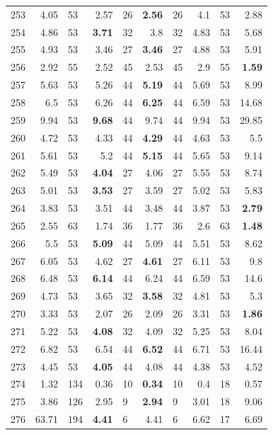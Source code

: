\begin{longtable}{lr@{\hskip 4pt}l@{\hskip 12pt}r@{\hskip 4pt}l@{\hskip 12pt}r@{\hskip 4pt}l@{\hskip 12pt}r@{\hskip 4pt}l@{\hskip 12pt}r}
253 & 4.05 & 53 & 2.57 & 26 & \textbf{2.56} & 26 & 4.1 & 53 & 2.88 \\
254 & 4.86 & 53 & \textbf{3.71} & 32 & 3.8 & 32 & 4.83 & 53 & 5.68 \\
255 & 4.93 & 53 & 3.46 & 27 & \textbf{3.46} & 27 & 4.88 & 53 & 5.91 \\
256 & 2.92 & 55 & 2.52 & 45 & 2.53 & 45 & 2.9 & 55 & \textbf{1.59} \\
257 & 5.63 & 53 & 5.26 & 44 & \textbf{5.19} & 44 & 5.69 & 53 & 8.99 \\
258 & 6.5 & 53 & 6.26 & 44 & \textbf{6.25} & 44 & 6.59 & 53 & 14.68 \\
259 & 9.94 & 53 & \textbf{9.68} & 44 & 9.74 & 44 & 9.94 & 53 & 29.85 \\
260 & 4.72 & 53 & 4.33 & 44 & \textbf{4.29} & 44 & 4.63 & 53 & 5.5 \\
261 & 5.61 & 53 & 5.2 & 44 & \textbf{5.15} & 44 & 5.65 & 53 & 9.14 \\
262 & 5.49 & 53 & \textbf{4.04} & 27 & 4.06 & 27 & 5.55 & 53 & 8.74 \\
263 & 5.01 & 53 & \textbf{3.53} & 27 & 3.59 & 27 & 5.02 & 53 & 5.83 \\
264 & 3.83 & 53 & 3.51 & 44 & 3.48 & 44 & 3.87 & 53 & \textbf{2.79} \\
265 & 2.55 & 63 & 1.74 & 36 & 1.77 & 36 & 2.6 & 63 & \textbf{1.48} \\
266 & 5.5 & 53 & \textbf{5.09} & 44 & 5.09 & 44 & 5.51 & 53 & 8.62 \\
267 & 6.05 & 53 & 4.62 & 27 & \textbf{4.61} & 27 & 6.11 & 53 & 9.8 \\
268 & 6.48 & 53 & \textbf{6.14} & 44 & 6.24 & 44 & 6.59 & 53 & 14.6 \\
269 & 4.73 & 53 & 3.65 & 32 & \textbf{3.58} & 32 & 4.81 & 53 & 5.3 \\
270 & 3.33 & 53 & 2.07 & 26 & 2.09 & 26 & 3.31 & 53 & \textbf{1.86} \\
271 & 5.22 & 53 & \textbf{4.08} & 32 & 4.09 & 32 & 5.25 & 53 & 8.04 \\
272 & 6.82 & 53 & 6.54 & 44 & \textbf{6.52} & 44 & 6.71 & 53 & 16.44 \\
273 & 4.45 & 53 & \textbf{4.05} & 44 & 4.08 & 44 & 4.38 & 53 & 4.52 \\
274 & 1.32 & 134 & 0.36 & 10 & \textbf{0.34} & 10 & 0.4 & 18 & 0.57 \\
275 & 3.86 & 126 & 2.95 & 9 & \textbf{2.94} & 9 & 3.01 & 18 & 9.06 \\
276 & 63.71 & 194 & \textbf{4.41} & 6 & 4.41 & 6 & 6.62 & 17 & 6.69 \\

\end{longtable}
